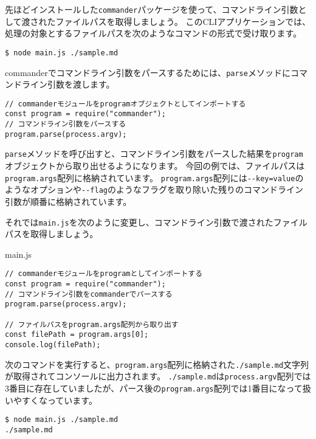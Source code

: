 先ほどインストールした\texttt{commander}パッケージを使って、コマンドライン引数として渡されたファイルパスを取得しましょう。
このCLIアプリケーションでは、処理の対象とするファイルパスを次のようなコマンドの形式で受け取ります。

\begin{lstlisting}
$ node main.js ./sample.md
\end{lstlisting}

commanderでコマンドライン引数をパースするためには、\texttt{parse}メソッドにコマンドライン引数を渡します。

\begin{lstlisting}
// commanderモジュールをprogramオブジェクトとしてインポートする
const program = require("commander");
// コマンドライン引数をパースする
program.parse(process.argv);
\end{lstlisting}

\texttt{parse}メソッドを呼び出すと、コマンドライン引数をパースした結果を\texttt{program}オブジェクトから取り出せるようになります。
今回の例では、ファイルパスは\texttt{program.args}配列に格納されています。
\texttt{program.args}配列には\texttt{-\/-key=value}のようなオプションや\texttt{-\/-flag}のようなフラグを取り除いた残りのコマンドライン引数が順番に格納されています。

それでは\texttt{main.js}を次のように変更し、コマンドライン引数で渡されたファイルパスを取得しましょう。

\begin{listtitle}
main.js
\end{listtitle}
\begin{lstlisting}
// commanderモジュールをprogramとしてインポートする
const program = require("commander");
// コマンドライン引数をcommanderでパースする
program.parse(process.argv);

// ファイルパスをprogram.args配列から取り出す
const filePath = program.args[0];
console.log(filePath);
\end{lstlisting}
\listend

次のコマンドを実行すると、\texttt{program.args}配列に格納された\texttt{./sample.md}文字列が取得されてコンソールに出力されます。
\texttt{./sample.md}は\texttt{process.argv}配列では3番目に存在していましたが、パース後の\texttt{program.args}配列では1番目になって扱いやすくなっています。

\begin{lstlisting}
$ node main.js ./sample.md
./sample.md
\end{lstlisting}

